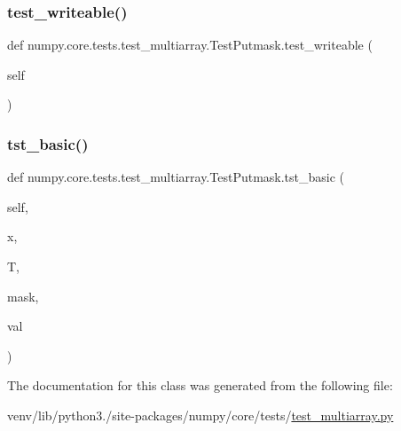 \subsubsection{\texorpdfstring{test\+\_\+writeable()}{test\_writeable()}}
{\footnotesize\ttfamily def numpy.\+core.\+tests.\+test\+\_\+multiarray.\+Test\+Putmask.\+test\+\_\+writeable (\begin{DoxyParamCaption}\item[{}]{self }\end{DoxyParamCaption})}

\mbox{\label{classnumpy_1_1core_1_1tests_1_1test__multiarray_1_1TestPutmask_ae72e120f3c05c6c431e35d19aee3c898}} 
\subsubsection{\texorpdfstring{tst\+\_\+basic()}{tst\_basic()}}
{\footnotesize\ttfamily def numpy.\+core.\+tests.\+test\+\_\+multiarray.\+Test\+Putmask.\+tst\+\_\+basic (\begin{DoxyParamCaption}\item[{}]{self,  }\item[{}]{x,  }\item[{}]{T,  }\item[{}]{mask,  }\item[{}]{val }\end{DoxyParamCaption})}



The documentation for this class was generated from the following file\+:\begin{DoxyCompactItemize}
\item 
venv/lib/python3./site-\/packages/numpy/core/tests/\hyperlink{core_2tests_2test__multiarray_8py}{test\+\_\+multiarray.\+py}\end{DoxyCompactItemize}
